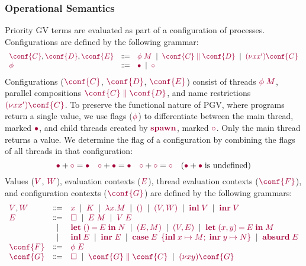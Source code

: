 \documentclass[main.tex]{subfiles}
\begin{document}
\subsubsection*{Operational Semantics}

Priority GV terms are evaluated as part of a configuration of processes. Configurations are defined by the following grammar:
\[
\begin{array}[t]{lcl}
    \tm{\conf{C}}, \tm{\conf{D}}, \tm{\conf{E}}
  & \Coloneqq & \tm{\phi\;M}
    \sep        \tm{\ppar{\conf{C}}{\conf{D}}}
    \sep        \tm{\res{x}{x'}{\conf{C}}}
  \\
  \tm{\phi}
  & \Coloneqq & \tm{\main}
    \sep        \tm{\child}
\end{array}
\]
Configurations ($\tm{\conf{C}}$, $\tm{\conf{D}}$, $\tm{\conf{E}}$) consist of threads $\tm{\phi\;M}$, parallel compositions $\tm{\ppar{\conf{C}}{\conf{D}}}$, and name restrictions $\tm{\res{x}{x'}{\conf{C}}}$. To preserve the functional nature of PGV, where programs return a single value, we use flags ($\tm{\phi}$) to differentiate between the main thread, marked $\tm{\main}$, and child threads created by $\tm{\spawn}$, marked $\tm{\child}$. Only the main thread returns a value. We determine the flag of a configuration by combining the flags of all threads in that configuration:
\[
  \tm{\main}  + \tm{\child} = \tm{\main}
  \quad
  \tm{\child} + \tm{\main}  = \tm{\main}
  \quad
  \tm{\child} + \tm{\child} = \tm{\child}
  \quad
  (\tm{\main}  + \tm{\main} \; \text{is undefined})
\]
Values ($\tm{V}$, $\tm{W}$), evaluation contexts ($\tm{E}$), thread evaluation contexts ($\tm{\conf{F}}$), and configuration contexts ($\tm{\conf{G}}$) are defined by the following grammars:
\[
\begin{array}[t]{lcl}
  \tm{V}, \tm{W}
  & \Coloneqq & \tm{x}
    \sep        \tm{K}
    \sep        \tm{\lambda x.M}
    \sep        \tm{\unit}
    \sep        \tm{\pair{V}{W}}
    \sep        \tm{\inl{V}}
    \sep        \tm{\inr{V}} \\
  \tm{E}
  & \Coloneqq & \tm{\hole}
    \sep        \tm{E\;M}
    \sep        \tm{V\;E} \\
  & \sep      & \tm{\letunit{E}{N}}
    \sep        \tm{\pair{E}{M}}
    \sep        \tm{\pair{V}{E}}
    \sep        \tm{\letpair{x}{y}{E}{M}} \\
  & \sep      & \tm{\inl{E}}
    \sep        \tm{\inr{E}}
    \sep        \tm{\casesum{E}{x}{M}{y}{N}}
    \sep        \tm{\absurd{E}} \\
  \tm{\conf{F}}
  & \Coloneqq & \tm{\phi\;E}
  \\
  \tm{\conf{G}}
  & \Coloneqq & \tm{\hole}
    \sep        \tm{\ppar{\conf{G}}{\conf{C}}}
    \sep        \tm{\res{x}{y}{\conf{G}}}
\end{array}
\]
\end{document}
